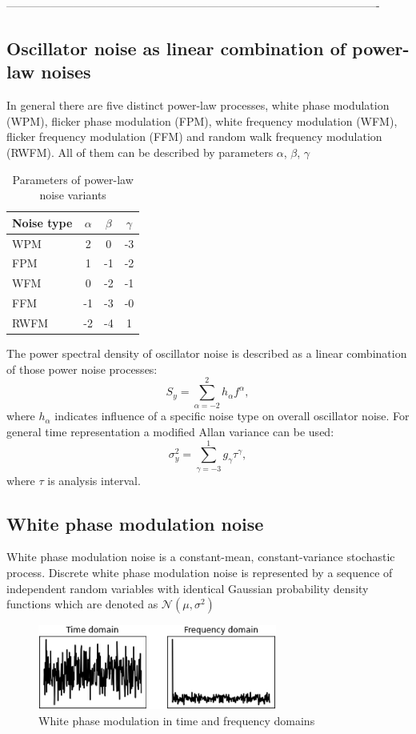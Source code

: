 ----------------------------------------------------------------------------------------------------
\subsection{Oscillator noise as linear combination of power-law noises}
In general there are five distinct power-law processes, white phase modulation (WPM), flicker 
phase modulation (FPM), white frequency modulation (WFM), flicker frequency modulation (FFM) and
random walk frequency modulation (RWFM).
All of them can be described by parameters $\alpha$, $\beta$, $\gamma$
\begin{table}[htb] 
	\centering
	\caption{Parameters of power-law noise variants}
	\label{tab:power-noise}
	\begin{tabular}{lccc}
		\hline
		\hline
		Noise type& $\alpha$& $\beta$& $\gamma$\\
		\hline
		WPM&   2 &  0& -3\\
		FPM&   1 & -1& -2\\
		WFM&   0 & -2& -1\\
		FFM&  -1 & -3& -0\\
		RWFM& -2 & -4&  1\\
		\hline
		\hline
	\end{tabular}
\end{table}
The power spectral density of oscillator noise is described as a linear combination of 
those power noise processes:
\begin{equation}
	\label{equ:linear_noise_comb}
	S_{y} = \sum_{\alpha=-2}^{2}h_{\alpha}f^{\alpha},
\end{equation}
where $h_{\alpha}$ indicates influence of a specific noise type on overall oscillator noise.
For general time representation a modified Allan variance can be used:
\begin{equation}
	\label{equ:allan_noise_comb}
	\sigma^{2}_{y} = \sum_{\gamma=-3}^{1}g_{\gamma}\tau^{\gamma},
\end{equation}
where $\tau$ is analysis interval.
\subsection{White phase modulation noise}
White phase modulation noise is a constant-mean, constant-variance stochastic process.
Discrete white phase modulation noise is represented by a sequence of independent random variables
with identical Gaussian probability density functions which are denoted as  
$\mathcal{N}(\mu,\sigma^{2})$
\begin{figure}[htb] 
	\label{fig:wpm}
	\centering
	\includegraphics[width=0.7\textwidth]{figures/wpm}
	\caption{White phase modulation in time and frequency domains}
\end{figure}

